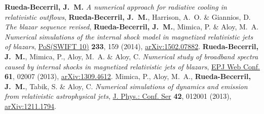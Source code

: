 \renewcommand{\refname}{Proceedings}
\setcounter{num}{0}
\renewcommand{\MyNbOfPub}{5}
\renewcommand*{\bibliographyitemlabel}{\arabic{enumiv}.}
\begin{thebibliography}{99}
   \textbf{Rueda-Becerril, J.~M.} \emph{A numerical approach for radiative cooling in relativistic outflows}, %
   \textbf{Rueda-Becerril, J.~M.}, Harrison, A.~O. \& Giannios, D. \emph{The blazar sequence revised}, %
   \textbf{Rueda-Becerril, J.~M.}, Mimica, P. \& Aloy, M.~A. \emph{Numerical simulations of the internal shock model in magnetized relativistic jets of blazars}, \href{https://doi.org/10.22323/1.233.0159}{PoS(SWIFT 10)} \textbf{233}, 159 (2014), \href{https://arxiv.org/abs/1502.07882}{arXiv:1502.07882}.
   \textbf{Rueda-Becerril, J.~M.}, Mimica, P., Aloy, M.~A. \& Aloy, C. \emph{Numerical study of broadband spectra caused by internal shocks in magnetized relativistic jets of blazars}, \href{https://doi.org/10.1051/epjconf/20136102007}{EPJ Web Conf.} \textbf{61}, 02007 (2013), \href{https://arxiv.org/abs/1309.4612}{arXiv:1309.4612}.
   Mimica, P., Aloy, M.~A., \textbf{Rueda-Becerril, J.~M.}, Tabik, S. \& Aloy, C. \emph{Numerical simulations of dynamics and emission from relativistic astrophysical jets}, \href{https://doi.org/10.1088/1742-6596/454/1/012001}{J. Phys.: Conf. Ser} \textbf{42}, 012001 (2013), \href{https://arxiv.org/abs/1211.1794}{arXiv:1211.1794}.
\end{thebibliography}





%

